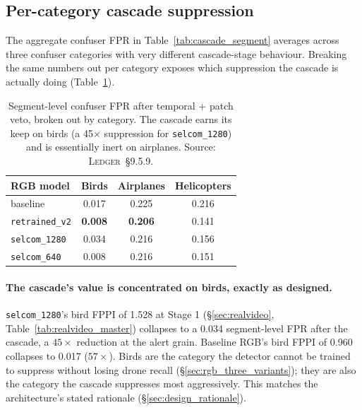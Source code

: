 \documentclass[12pt,a4paper,oneside,openright]{book}
\begin{document}
\subsection{Per-category cascade suppression}
\label{sec:realvideo_percategory}

The aggregate confuser FPR in Table~\ref{tab:cascade_segment} averages across three confuser categories with very different cascade-stage behaviour. Breaking the same numbers out per category exposes which suppression the cascade is actually doing (Table~\ref{tab:cascade_percategory}).

\begin{table}[htbp]
    \centering
    \caption{Segment-level confuser FPR after temporal + patch veto, broken out by category. The cascade earns its keep on birds (a 45$\times$ suppression for \texttt{selcom\_1280}) and is essentially inert on airplanes. Source: \textsc{Ledger}~\S9.5.9.}
    \label{tab:cascade_percategory}
    \begin{tabular}{lccc}
        \toprule
        RGB model & Birds & Airplanes & Helicopters \\
        \midrule
        baseline           & 0.017 & 0.225 & 0.216 \\
        \texttt{retrained\_v2} & \textbf{0.008} & \textbf{0.206} & 0.141 \\
        \texttt{selcom\_1280}  & 0.034 & 0.216 & 0.156 \\
        \texttt{selcom\_640}   & 0.008 & 0.216 & 0.151 \\
        \bottomrule
    \end{tabular}
\end{table}

\paragraph{The cascade's value is concentrated on birds, exactly as designed.}
\texttt{selcom\_1280}'s bird FPPI of 1.528 at Stage 1 (\S\ref{sec:realvideo}, Table~\ref{tab:realvideo_master}) collapses to a 0.034 segment-level FPR after the cascade, a $45\times$ reduction at the alert grain. Baseline RGB's bird FPPI of 0.960 collapses to 0.017 ($57\times$). Birds are the category the detector cannot be trained to suppress without losing drone recall (\S\ref{sec:rgb_three_variants}); they are also the category the cascade suppresses most aggressively. This matches the architecture's stated rationale (\S\ref{sec:design_rationale}).
\end{document}
